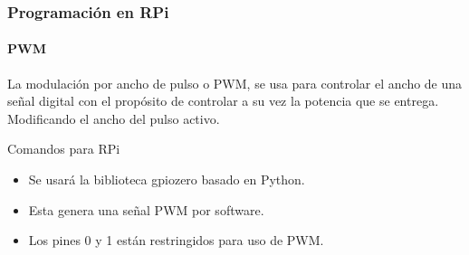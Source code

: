 \documentclass{beamer}
\begin{document}
	\begin{frame}
		\frametitle{Programación en RPi}
		\framesubtitle{PWM}
		La modulación por ancho de pulso o PWM, se usa para controlar el ancho de una señal digital con el propósito de controlar a su vez la potencia que se entrega. Modificando el ancho del pulso activo.
		\begin{mybox}{Comandos para RPi}
			\begin{itemize}
				\item Se usará la biblioteca gpiozero basado en Python.
				\item Esta genera una señal PWM por software.
				\item Los pines 0 y 1 están restringidos para uso de PWM.
			\end{itemize}
		\end{mybox}
	\end{frame}
\end{document}
